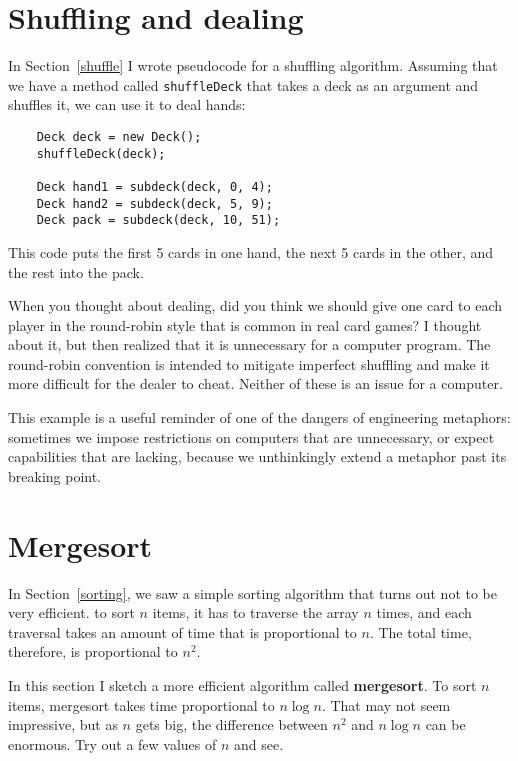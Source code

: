 \documentclass[12pt]{book}
\theoremstyle{definition}
\begin{document}
\section{Shuffling and dealing}

In Section~\ref{shuffle} I wrote pseudocode for a shuffling algorithm.
Assuming that we have a method called {\tt shuffleDeck} that takes
a deck as an argument and shuffles it, we can use it to deal hands:

\begin{lstlisting}
    Deck deck = new Deck();
    shuffleDeck(deck);

    Deck hand1 = subdeck(deck, 0, 4);
    Deck hand2 = subdeck(deck, 5, 9);
    Deck pack = subdeck(deck, 10, 51);
\end{lstlisting}
%
This code puts the first 5 cards in one hand, the next 5 cards
in the other, and the rest into the pack.

When you thought about dealing, did you think we should give one
card to each player in the round-robin style that is common
in real card games?  I thought about it, but then realized that it is
unnecessary for a computer program.  The round-robin convention is
intended to mitigate imperfect shuffling and make it more difficult
for the dealer to cheat.  Neither of these is an issue for a computer.

This example is a useful reminder of one of the dangers of engineering
metaphors: sometimes we impose restrictions on computers that are
unnecessary, or expect capabilities that are lacking, because we
unthinkingly extend a metaphor past its breaking point.


\section {Mergesort}
\label{mergesort}

In Section~\ref{sorting}, we saw a simple sorting algorithm that turns
out not to be very efficient.  to sort $n$ items, it has to
traverse the array $n$ times, and each traversal takes an amount of
time that is proportional to $n$.  The total time, therefore, is
proportional to $n^2$.

In this section I sketch a more efficient algorithm called {\bf
mergesort}.  To sort $n$ items, mergesort takes time proportional to
$n \log n$.  That may not seem impressive, but as $n$ gets big, the
difference between $n^2$ and $n \log n$ can be enormous.  Try out a
few values of $n$ and see.
\end{document}
